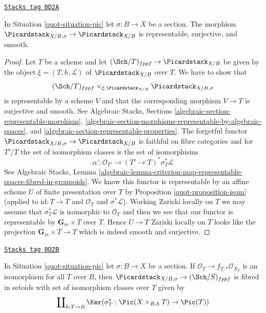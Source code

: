 \begin{lemma}
\label{quot-lemma-compare-pic-with-section}
\href{https://stacks.math.columbia.edu/tag/0D2A}{\texttt{Stacks tag 0D2A}}

In Situation \ref{quot-situation-pic} let $\sigma : B \to X$ be a section.
The morphism $\Picardstack_{X/B, \sigma} \to \Picardstack_{X/B}$
is representable, surjective, and smooth.
\end{lemma}

\begin{proof}

Let $T$ be a scheme and let $(\Sch/T)_{fppf} \to \Picardstack_{X/B}$
be given by the object $\xi = (T, h, \mathcal{L})$ of $\Picardstack_{X/B}$
over $T$. We have to show that
$$
(\Sch/T)_{fppf} \times_{\xi, \Picardstack_{X/B}} \Picardstack_{X/B, \sigma}
$$
is representable by a scheme $V$ and that the corresponding morphism
$V \to T$ is surjective and smooth. See
Algebraic Stacks, Sections \ref{algebraic-section-representable-morphism},
\ref{algebraic-section-morphisms-representable-by-algebraic-spaces}, and
\ref{algebraic-section-representable-properties}.
The forgetful functor $\Picardstack_{X/B, \sigma} \to \Picardstack_{X/B}$
is faithful on fibre categories and for $T'/T$ the set of isomorphism
classes is the set of isomorphisms
$$
\alpha' : \mathcal{O}_{T'} \longrightarrow (T' \to T)^*\sigma_T^*\mathcal{L}
$$
See Algebraic Stacks, Lemma
\ref{algebraic-lemma-criterion-map-representable-spaces-fibred-in-groupoids}.
We know this functor is representable by an affine scheme $U$ of finite
presentation over $T$ by Proposition \ref{quot-proposition-isom}
(applied to $\text{id} : T \to T$ and $\mathcal{O}_T$ and
$\sigma^*\mathcal{L}$). Working Zariski locally on $T$ we may
assume that $\sigma_T^*\mathcal{L}$ is isomorphic to $\mathcal{O}_T$
and then we see that our functor is representable by
$\mathbf{G}_m \times T$ over $T$. Hence
$U \to T$ Zariski locally on $T$ looks like
the projection $\mathbf{G}_m \times T \to T$ which
is indeed smooth and surjective.
\end{proof}

\begin{lemma}
\label{quot-lemma-flat-geometrically-connected-fibres-with-section-functor-stack}
\href{https://stacks.math.columbia.edu/tag/0D2B}{\texttt{Stacks tag 0D2B}}

In Situation \ref{quot-situation-pic} let $\sigma : B \to X$ be a section.
If $\mathcal{O}_T \to f_{T, *}\mathcal{O}_{X_T}$ is an isomorphism
for all $T$ over $B$, then
$\Picardstack_{X/B, \sigma} \to (\Sch/S)_{fppf}$
is fibred in setoids with set of isomorphism classes over $T$ given by
$$
\coprod\nolimits_{h : T \to B}
\Ker(\sigma_T^* : \Pic(X \times_{B, h} T) \to \Pic(T))
$$
\end{lemma}

